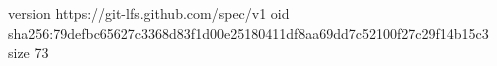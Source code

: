 version https://git-lfs.github.com/spec/v1
oid sha256:79defbc65627c3368d83f1d00e25180411df8aa69dd7c52100f27c29f14b15c3
size 73
